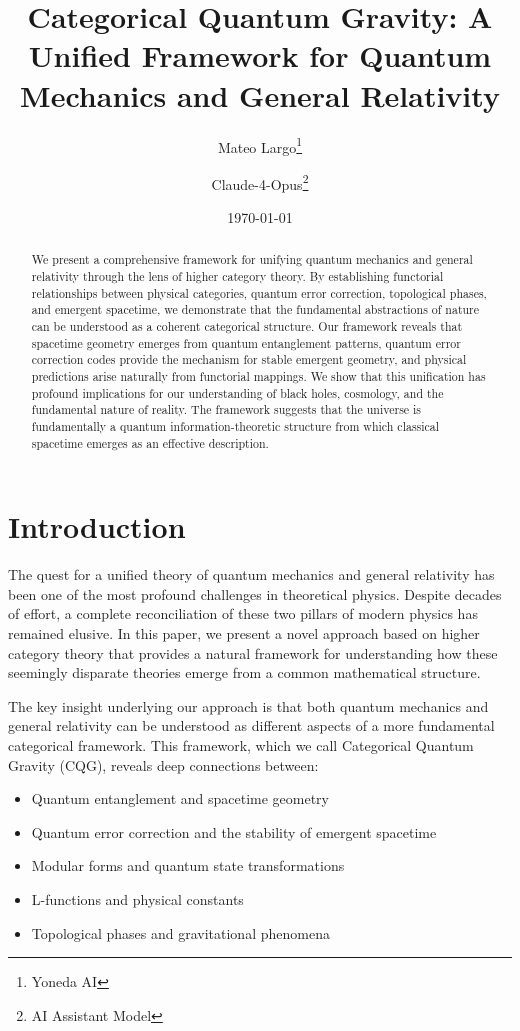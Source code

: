 \documentclass[12pt,a4paper]{article}
\title{Categorical Quantum Gravity: A Unified Framework for Quantum Mechanics and General Relativity}
\author{Mateo Largo\thanks{Yoneda AI} \and Claude-4-Opus\thanks{AI Assistant Model}}
\date{\today}
\theoremstyle{plain}
\theoremstyle{definition}
\theoremstyle{remark}
\begin{document}
\maketitle

\begin{abstract}
We present a comprehensive framework for unifying quantum mechanics and general relativity through the lens of higher category theory. By establishing functorial relationships between physical categories, quantum error correction, topological phases, and emergent spacetime, we demonstrate that the fundamental abstractions of nature can be understood as a coherent categorical structure. Our framework reveals that spacetime geometry emerges from quantum entanglement patterns, quantum error correction codes provide the mechanism for stable emergent geometry, and physical predictions arise naturally from functorial mappings. We show that this unification has profound implications for our understanding of black holes, cosmology, and the fundamental nature of reality. The framework suggests that the universe is fundamentally a quantum information-theoretic structure from which classical spacetime emerges as an effective description.
\end{abstract}

\section{Introduction}

The quest for a unified theory of quantum mechanics and general relativity has been one of the most profound challenges in theoretical physics. Despite decades of effort, a complete reconciliation of these two pillars of modern physics has remained elusive. In this paper, we present a novel approach based on higher category theory that provides a natural framework for understanding how these seemingly disparate theories emerge from a common mathematical structure.

The key insight underlying our approach is that both quantum mechanics and general relativity can be understood as different aspects of a more fundamental categorical framework. This framework, which we call Categorical Quantum Gravity (CQG), reveals deep connections between:

\begin{itemize}
\item Quantum entanglement and spacetime geometry
\item Quantum error correction and the stability of emergent spacetime
\item Modular forms and quantum state transformations
\item L-functions and physical constants
\item Topological phases and gravitational phenomena
\end{itemize}
\end{document}
